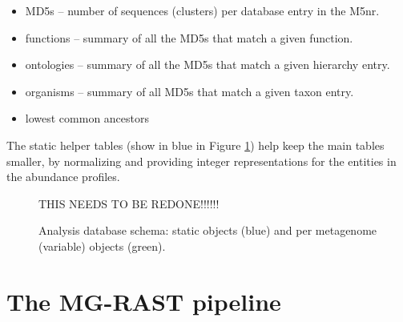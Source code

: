 \documentclass[12pt,fullpage]{report}
\begin{document}
\begin{itemize}
\item MD5s --
number of sequences (clusters) per database entry in the M5nr.

\item functions --
summary of all the MD5s that match a given function.

\item ontologies --
summary of all the MD5s that match a given hierarchy entry.

\item organisms --
summary of all MD5s that match a given taxon entry.

\item lowest common ancestors
\end{itemize}

The static helper tables (show in blue in Figure \ref{fig:mgrast_analysis-schema}) help
keep the main tables smaller, by normalizing and providing integer representations for the entities in the abundance profiles.

\begin{figure}
\begin{center}
THIS NEEDS TO BE REDONE!!!!!!

\end{center}
\caption{
Analysis database schema: static objects (blue) and per metagenome (variable) objects (green).
}
\label{fig:mgrast_analysis-schema}
\end{figure}





\chapter{The MG-RAST pipeline}
\label{section:mgrast_pipeline_details}
\end{document}
